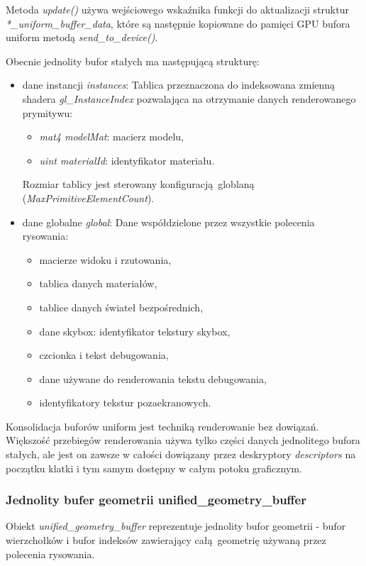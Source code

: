 Metoda \textit{update()} używa wejściowego wskaźnika funkcji do aktualizacji struktur \textit{*\_uniform\_buffer\_data}, które są następnie kopiowane do pamięci GPU bufora uniform metodą \textit{send\_to\_device()}.

Obecnie jednolity bufor stałych ma następującą strukturę:
\begin{itemize}
	\item dane instancji \textit{instances}:
	Tablica przeznaczona do indeksowana zmienną shadera \textit{gl\_InstanceIndex} pozwalająca na otrzymanie danych renderowanego prymitywu:
	\begin{itemize}
		\item \textit{mat4 modelMat}: macierz modelu,
		\item \textit{uint materialId}: identyfikator materiału.
	\end{itemize}
	Rozmiar tablicy jest sterowany konfiguracją globlaną (\textit{MaxPrimitiveElementCount}).
	
	\item dane globalne \textit{global}:
	Dane współdzielone przez wszystkie polecenia rysowania:
	\begin{itemize}
		\item macierze widoku i rzutowania,
		\item tablica danych materiałów,
		\item tablice danych świateł bezpośrednich,
		\item dane skybox: identyfikator tekstury skybox,
		\item czcionka i tekst debugowania,
		\item dane używane do renderowania tekstu debugowania,
		\item identyfikatory tekstur pozaekranowych.
	\end{itemize}
\end{itemize}

Konsolidacja buforów uniform jest techniką renderowanie bez dowiązań.
Większość przebiegów renderowania używa tylko części danych jednolitego bufora stałych, ale jest on zawsze w całości dowiązany przez deskryptory \textit{descriptors} na początku klatki i tym samym dostępny w całym potoku graficznym.


\subsubsection{Jednolity bufer geometrii unified\_geometry\_buffer}
Obiekt \textit{unified\_geometry\_buffer} reprezentuje jednolity bufor geometrii - bufor wierzchołków i bufor indeksów zawierający całą geometrię używaną przez polecenia rysowania.

